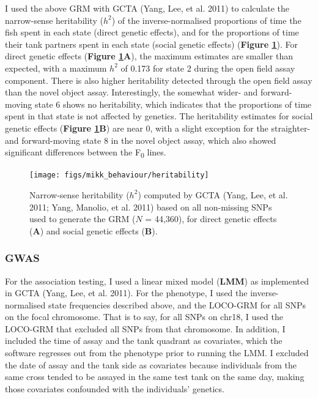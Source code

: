\documentclass[
]{book}
\begin{document}
I used the above GRM with GCTA (Yang, Lee, et al. 2011) to calculate the narrow-sense heritability (\(h^2\)) of the inverse-normalised proportions of time the fish spent in each state (direct genetic effects), and for the proportions of time their tank partners spent in each state (social genetic effects) (\textbf{Figure \ref{fig:F2-heritability}}). For direct genetic effects (\textbf{Figure \ref{fig:F2-heritability}A}), the maximum estimates are smaller than expected, with a maximum \(h^2\) of 0.173 for state 2 during the open field assay component. There is also higher heritability detected through the open field assay than the novel object assay. Interestingly, the somewhat wider- and forward-moving state 6 shows no heritability, which indicates that the proportions of time spent in that state is not affected by genetics. The heritability estimates for social genetic effects (\textbf{Figure \ref{fig:F2-heritability}B}) are near 0, with a slight exception for the straighter- and forward-moving state 8 in the novel object assay, which also showed significant differences between the F\textsubscript{0} lines.



\begin{figure}
\texttt{[image: figs/mikk\_behaviour/heritability]} \caption{Narrow-sense heritability (\(h^2\)) computed by GCTA (Yang, Lee, et al. 2011; Yang, Manolio, et al. 2011) based on all non-missing SNPs used to generate the GRM (\(N\) = 44,360), for direct genetic effects (\textbf{A}) and social genetic effects (\textbf{B}).}\label{fig:F2-heritability}
\end{figure}

\hypertarget{gwas-1}{%
\subsubsection{GWAS}\label{gwas-1}}

For the association testing, I used a linear mixed model (\textbf{LMM}) as implemented in GCTA (Yang, Lee, et al. 2011). For the phenotype, I used the inverse-normalised state frequencies described above, and the LOCO-GRM for all SNPs on the focal chromosome. That is to say, for all SNPs on chr18, I used the LOCO-GRM that excluded all SNPs from that chromosome. In addition, I included the time of assay and the tank quadrant as covariates, which the software regresses out from the phenotype prior to running the LMM. I excluded the date of assay and the tank side as covariates because individuals from the same cross tended to be assayed in the same test tank on the same day, making those covariates confounded with the individuals' genetics.
\end{document}
